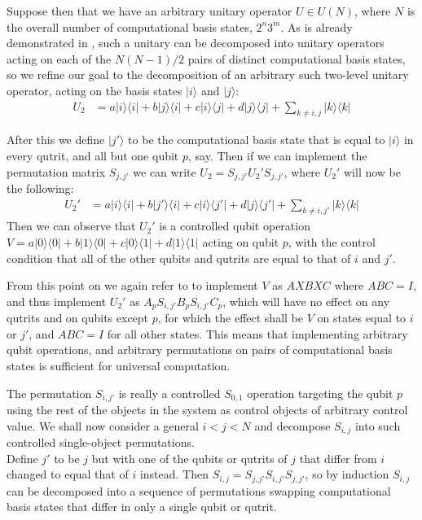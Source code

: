 \documentclass[]{article}
\newcommand{\bra}[1]{\langle #1 |}
\newcommand{\ket}[1]{| #1 \rangle}
\begin{document}
Suppose then that we have an arbitrary unitary operator $U \in U(N)$, where $N$ is the overall number of computational basis states, $2^n3^m$. As is already demonstrated in \cite{textbook}, such a unitary can be decomposed into unitary operators acting on each of the $N(N-1)/2$ pairs of distinct computational basis states, so we refine our goal to the decomposition of an arbitrary such two-level unitary operator, acting on the basis states $\ket{i}$ and $\ket{j}$:
\begin{align*}
U_2 &= a\ket{i}\bra{i} + b\ket{j}\bra{i} + c\ket{i}\bra{j} + d\ket{j}\bra{j} + \sum_{k \neq i, j} \ket{k}\bra{k}
\end{align*}

After this we define $\ket{j'}$ to be the computational basis state that is equal to $\ket{i}$ in every qutrit, and all but one qubit $p$, say. Then if we can implement the permutation matrix $S_{j,j'}$ we can write $U_2 = S_{j,j'}U_2'S_{j,j'}$, where $U_2'$ will now be the following:
\begin{align*}
U_2' &= a\ket{i}\bra{i} + b\ket{j'}\bra{i} + c\ket{i}\bra{j'} + d\ket{j}\bra{j'} + \sum_{k \neq i, j'} \ket{k}\bra{k}
\end{align*}
Then we can observe that $U_2'$ is a controlled qubit operation $V = a\ket{0}\bra{0} + b\ket{1}\bra{0} + c\ket{0}\bra{1} + d\ket{1}\bra{1}$ acting on qubit $p$, with the control condition that all of the other qubits and qutrits are equal to that of $i$ and $j'$.

From this point on we again refer to \cite{textbook} to implement $V$ as $AXBXC$ where $ABC=I$, and thus implement $U_2'$ as $A_pS_{i,j'}B_pS_{i,j'}C_p$, which will have no effect on any qutrits and on qubits except $p$, for which the effect shall be $V$ on states equal to $i$ or $j'$, and $ABC=I$ for all other states. This means that implementing arbitrary qubit operations, and arbitrary permutations on pairs of computational basis states is sufficient for universal computation.

The permutation $S_{i,j'}$ is really a controlled $S_{0,1}$ operation targeting the qubit $p$ using the rest of the objects in the system as control objects of arbitrary control value. We shall now consider a general $i < j < N$ and decompose $S_{i,j}$ into such controlled single-object permutations.
\\Define $j'$ to be $j$ but with one of the qubits or qutrits of $j$ that differ from $i$ changed to equal that of $i$ instead. Then $S_{i,j} = S_{j,j'}S_{i,j'}S_{j,j'}$, so by induction $S_{i,j}$ can be decomposed into a sequence of permutations swapping computational basis states that differ in only a single qubit or qutrit.
\end{document}

